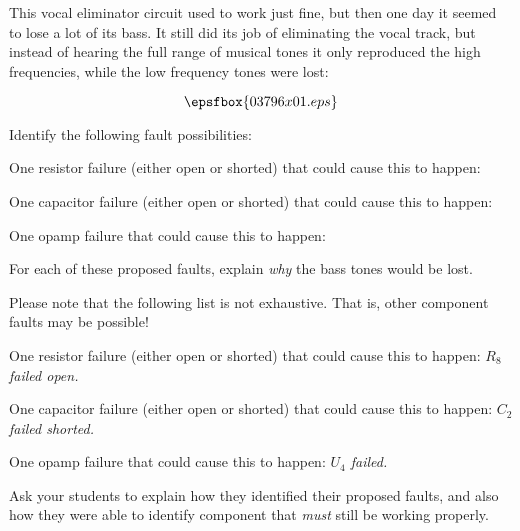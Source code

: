 

This vocal eliminator circuit used to work just fine, but then one day it seemed to lose a lot of its bass.  It still did its job of eliminating the vocal track, but instead of hearing the full range of musical tones it only reproduced the high frequencies, while the low frequency tones were lost:

$$\epsfbox{03796x01.eps}$$

Identify the following fault possibilities:

\vskip 10pt

\noindent
One resistor failure (either open or shorted) that could cause this to happen:

\vskip 15pt

\noindent
One capacitor failure (either open or shorted) that could cause this to happen:

\vskip 15pt

\noindent
One opamp failure that could cause this to happen:

\vskip 15pt

For each of these proposed faults, explain {\it why} the bass tones would be lost.







Please note that the following list is not exhaustive.  That is, other component faults may be possible!

\vskip 10pt

\noindent
One resistor failure (either open or shorted) that could cause this to happen: {\it $R_8$ failed open.}

\vskip 15pt

\noindent
One capacitor failure (either open or shorted) that could cause this to happen: {\it $C_2$ failed shorted.}

\vskip 15pt

\noindent
One opamp failure that could cause this to happen: {\it $U_4$ failed.}







Ask your students to explain how they identified their proposed faults, and also how they were able to identify component that {\it must} still be working properly.




